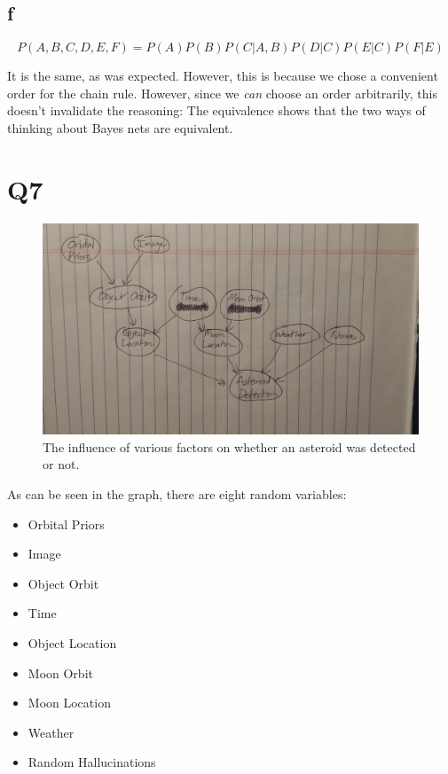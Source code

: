 \documentclass{article}
\begin{document}
\subsection{f}

$$
P(A, B, C, D, E, F) = P(A) P(B) P(C | A, B) P(D | C) P(E | C) P(F | E)
$$

It is the same, as was expected. However, this is because we chose a convenient 
order for the chain rule. However, since we \textit{can} choose an order arbitrarily, 
this doesn't invalidate the reasoning: The equivalence shows that the two ways of thinking about 
Bayes nets are equivalent.

\section{Q7}

\begin{figure}[!ht]
	\centering
	\includegraphics[width=120mm]{q7-graph.jpg}
	\caption{The influence of various factors on whether an asteroid was detected 
        or not.}
\end{figure}

As can be seen in the graph, there are eight random variables:

\begin{itemize}
    \item Orbital Priors
    \item Image
    \item Object Orbit
    \item Time
    \item Object Location
    \item Moon Orbit
    \item Moon Location
    \item Weather
    \item Random Hallucinations
\end{itemize}
\end{document}
